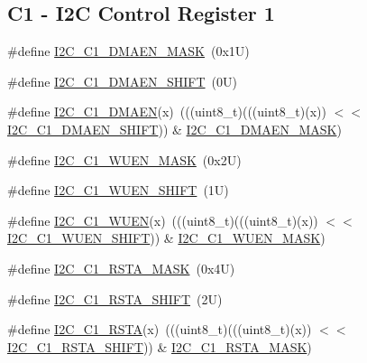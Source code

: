 \subsection*{C1 -\/ I2C Control Register 1}
\begin{DoxyCompactItemize}
\item 
\#define \mbox{\hyperlink{group___i2_c___register___masks_gadfd8fccdd35a4944a1e53ffa26e5d06b}{I2\+C\+\_\+\+C1\+\_\+\+D\+M\+A\+E\+N\+\_\+\+M\+A\+SK}}~(0x1\+U)
\item 
\#define \mbox{\hyperlink{group___i2_c___register___masks_ga1cd5f87cc18a56d293697f0463e2a9e3}{I2\+C\+\_\+\+C1\+\_\+\+D\+M\+A\+E\+N\+\_\+\+S\+H\+I\+FT}}~(0\+U)
\item 
\#define \mbox{\hyperlink{group___i2_c___register___masks_gae8283d400fa6719b68eabf9129d5cec7}{I2\+C\+\_\+\+C1\+\_\+\+D\+M\+A\+EN}}(x)~(((uint8\+\_\+t)(((uint8\+\_\+t)(x)) $<$$<$ \mbox{\hyperlink{group___i2_c___register___masks_ga1cd5f87cc18a56d293697f0463e2a9e3}{I2\+C\+\_\+\+C1\+\_\+\+D\+M\+A\+E\+N\+\_\+\+S\+H\+I\+FT}})) \& \mbox{\hyperlink{group___i2_c___register___masks_gadfd8fccdd35a4944a1e53ffa26e5d06b}{I2\+C\+\_\+\+C1\+\_\+\+D\+M\+A\+E\+N\+\_\+\+M\+A\+SK}})
\item 
\#define \mbox{\hyperlink{group___i2_c___register___masks_ga708d3eded28946d6f2e4b7ed5aff8fe8}{I2\+C\+\_\+\+C1\+\_\+\+W\+U\+E\+N\+\_\+\+M\+A\+SK}}~(0x2\+U)
\item 
\#define \mbox{\hyperlink{group___i2_c___register___masks_gad1bec740751b47fd0f4e02d913c3b287}{I2\+C\+\_\+\+C1\+\_\+\+W\+U\+E\+N\+\_\+\+S\+H\+I\+FT}}~(1\+U)
\item 
\#define \mbox{\hyperlink{group___i2_c___register___masks_ga171df40460d773ec95fa8963897b51d3}{I2\+C\+\_\+\+C1\+\_\+\+W\+U\+EN}}(x)~(((uint8\+\_\+t)(((uint8\+\_\+t)(x)) $<$$<$ \mbox{\hyperlink{group___i2_c___register___masks_gad1bec740751b47fd0f4e02d913c3b287}{I2\+C\+\_\+\+C1\+\_\+\+W\+U\+E\+N\+\_\+\+S\+H\+I\+FT}})) \& \mbox{\hyperlink{group___i2_c___register___masks_ga708d3eded28946d6f2e4b7ed5aff8fe8}{I2\+C\+\_\+\+C1\+\_\+\+W\+U\+E\+N\+\_\+\+M\+A\+SK}})
\item 
\#define \mbox{\hyperlink{group___i2_c___register___masks_ga656f6747e8edc8299767365ea1ac9d70}{I2\+C\+\_\+\+C1\+\_\+\+R\+S\+T\+A\+\_\+\+M\+A\+SK}}~(0x4\+U)
\item 
\#define \mbox{\hyperlink{group___i2_c___register___masks_gac6c61e0bd2615da3bbc3079984192dd7}{I2\+C\+\_\+\+C1\+\_\+\+R\+S\+T\+A\+\_\+\+S\+H\+I\+FT}}~(2\+U)
\item 
\#define \mbox{\hyperlink{group___i2_c___register___masks_ga31b0a3b7726742ff59778fbccb84dd28}{I2\+C\+\_\+\+C1\+\_\+\+R\+S\+TA}}(x)~(((uint8\+\_\+t)(((uint8\+\_\+t)(x)) $<$$<$ \mbox{\hyperlink{group___i2_c___register___masks_gac6c61e0bd2615da3bbc3079984192dd7}{I2\+C\+\_\+\+C1\+\_\+\+R\+S\+T\+A\+\_\+\+S\+H\+I\+FT}})) \& \mbox{\hyperlink{group___i2_c___register___masks_ga656f6747e8edc8299767365ea1ac9d70}{I2\+C\+\_\+\+C1\+\_\+\+R\+S\+T\+A\+\_\+\+M\+A\+SK}})
$$
\end{DoxyCompactItemize}
